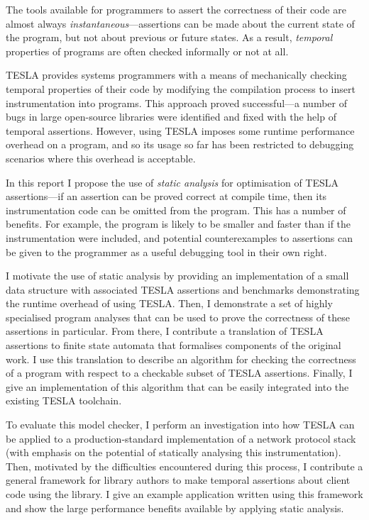 The tools available for programmers to assert the correctness of their code are
almost always \emph{instantaneous}---assertions can be made about the current
state of the program, but not about previous or future states. As a result,
\emph{temporal} properties of programs are often checked informally or not at
all.

TESLA \cite{anderson_tesla:_2014} provides systems programmers with a means of
mechanically checking temporal properties of their code by modifying the
compilation process to insert instrumentation into programs. This approach
proved successful---a number of bugs in large open-source libraries were
identified and fixed with the help of temporal assertions. However, using TESLA
imposes some runtime performance overhead on a program, and so its usage so far
has been restricted to debugging scenarios where this overhead is acceptable.

In this report I propose the use of \emph{static analysis} for optimisation of
TESLA assertions---if an assertion can be proved correct at compile time, then
its instrumentation code can be omitted from the program. This has a number of
benefits. For example, the program is likely to be smaller and faster than if
the instrumentation were included, and potential counterexamples to assertions
can be given to the programmer as a useful debugging tool in their own right.

I motivate the use of static analysis by providing an implementation of a small
data structure with associated TESLA assertions and benchmarks demonstrating the
runtime overhead of using TESLA.  Then, I demonstrate a set of highly
specialised program analyses that can be used to prove the correctness of these
assertions in particular.  From there, I contribute a translation of TESLA
assertions to finite state automata that formalises components of the original
work. I use this translation to describe an algorithm for checking the
correctness of a program with respect to a checkable subset of TESLA assertions.
Finally, I give an implementation of this algorithm that can be easily
integrated into the existing TESLA toolchain.

To evaluate this model checker, I perform an investigation into how TESLA can be
applied to a production-standard implementation of a network protocol stack
(with emphasis on the potential of statically analysing this instrumentation).
Then, motivated by the difficulties encountered during this process, I
contribute a general framework for library authors to make temporal assertions
about client code using the library. I give an example application written using
this framework and show the large performance benefits available by applying
static analysis.
